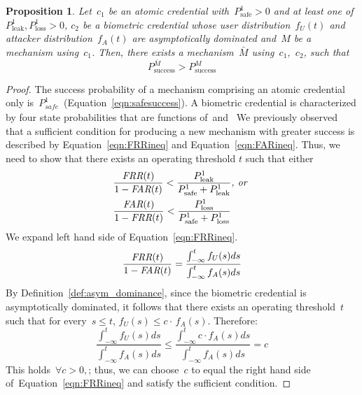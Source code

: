\documentclass[conference,compsoc]{IEEEtran}
\newtheorem{proposition}{Proposition}
\begin{document}
\begin{proposition}\label{thm:biometric-improves-security}
Let~$c_1$ be an atomic credential with~$P^1_\text{safe} > 0$ and at least one of~$P^1_\text{leak},P^1_\text{loss} > 0$, $c_2$ be a biometric credential whose user distribution~$f_U(t)$ and attacker distribution~$f_A(t)$ are asymptotically dominated and~$M$ be a mechanism using~$c_1$. Then, there exists a mechanism~$\bar{M}$ using~$c_1$,~$c_2$, such that
    \begin{equation*}
        P_{\mathrm{success}}^{\bar{M}} > P_{\mathrm{success}}^{M}
    \end{equation*}
\end{proposition}

\begin{proof}
The success probability of a mechanism comprising an atomic credential only is~$P^{1}_\textit{safe}$~(Equation~\ref{eqn:safesuccess}). A biometric credential is characterized by four state probabilities that are functions of~\FAR and~\FRR
\contprobabilities
We previously observed that a sufficient condition for producing a new mechanism with greater success is described by Equation~\ref{eqn:FRRineq} and Equation~\ref{eqn:FARineq}. Thus, we need to show that there exists an operating threshold $t$ such that either
\begin{equation*}
    \begin{aligned}
    &\frac{\textit{FRR}(t)}{1-\textit{FAR}(t)} < \frac{P^{1}_{\text{leak}}}{P^{1}_{\text{safe}}+P^{1}_{\text{leak}}} \textit{, or } \\
    &\frac{\textit{FAR}(t)}{1-\textit{FRR}(t)} < \frac{P^{1}_{\text{loss}}}{P^{1}_{\text{safe}}+P^{1}_{\text{loss}}}
    \end{aligned}
\end{equation*}
We expand left hand side of Equation~\ref{eqn:FRRineq}. 
\begin{equation*}
\frac{\textit{FRR}(t)}{1-\textit{FAR}(t)} = \frac{\int_{-\infty}^{t} f_U(s) ds}{\int_{-\infty}^{t} f_A(s) ds}
\end{equation*}
By Definition~\ref{def:asym_dominance}, since the biometric credential is asymptotically dominated, it follows that there exists an operating threshold~$t$ such that for every~$s \le t$, $f_U(s) \le c\cdot\,f_A(s)$. Therefore:
\begin{equation*}
\frac{\int_{-\infty}^{t} f_U(s) ds}{\int_{-\infty}^{t} f_A(s) ds} \le \frac{\int_{-\infty}^{t} c \cdot f_A(s) ds}{\int_{-\infty}^{t} f_A(s) ds} = c
\end{equation*}
This holds~$\forall c > 0,$; thus, we can choose~$c$ to equal the right hand side of~Equation~\ref{eqn:FRRineq} and satisfy the sufficient condition.

\end{proof}
\end{document}
